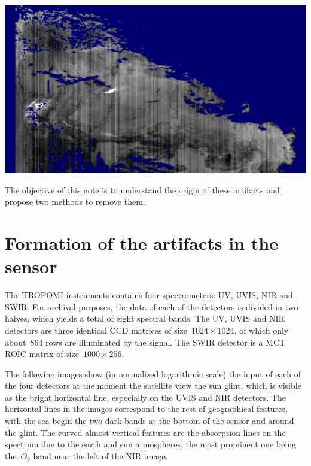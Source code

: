 \documentclass[a4paper]{article}    %
\theoremstyle{note}
\theoremstyle{plain}
\begin{document}
\includegraphics[width=.8\textwidth]{f/cropblue.png}

The objective of this note is to understand the origin of these artifacts and
propose two methods to remove them.

\section{Formation of the artifacts in the sensor}

The TROPOMI instruments contains four spectrometers: UV, UVIS, NIR and SWIR.
For archival purposes, the data of each of the detectors is divided in two
halves, which yields a total of eight spectral bands.  The UV, UVIS and NIR
detectors are three identical CCD matrices of size~$1024\times 1024$, of
which only about~$864$ rows are illuminated by the signal.  The SWIR detector
is a MCT ROIC matrix of size~$1000\times 256$.

The following images show (in normalized logarithmic scale) the input of each
of the four detectors at the moment the satellite view the sun glint, which
is visible as the bright horizontal line, especially on the UVIS and NIR
detectors.  The horizontal lines in the images correspond to the rest of
geographical features, with the sea begin the two dark bands at the bottom of
the sensor and around the glint.  The curved almost vertical features are the
absorption lines on the spectrum due to the earth and sun atmospheres, the
most prominent one being the~$O_2$ band near the left of the NIR image.
\end{document}
